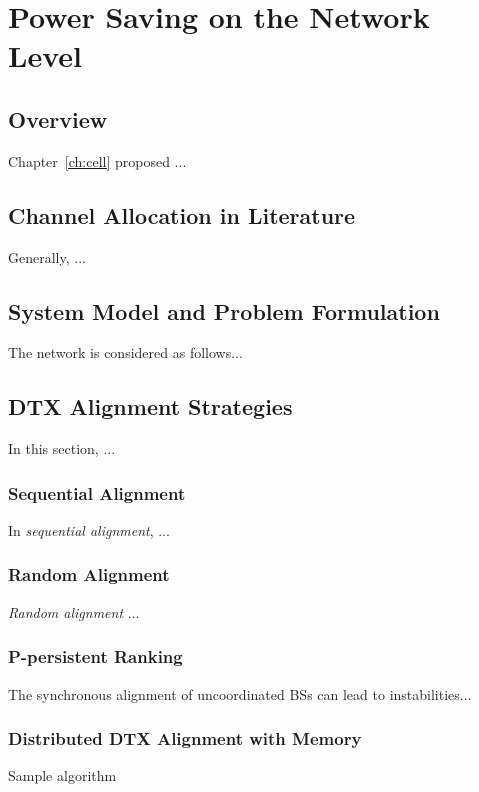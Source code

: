 \chapter{Power Saving on the Network Level}
\label{ch:network}

\section{Overview}
Chapter~\ref{ch:cell} proposed ...

\section{Channel Allocation in Literature}
\label{ch5:literature}
Generally, ...

\section{System Model and Problem Formulation}
\label{ch5:problem}
The network is considered as follows...

\section{\ac{DTX} Alignment Strategies}
\label{ch5:solutions}
In this section, ...
\subsection{Sequential Alignment}
In \emph{sequential alignment}, ...


\subsection{Random Alignment}
\emph{Random alignment} ...
\subsection{P-persistent Ranking}
The synchronous alignment of uncoordinated \acp{BS} can lead to instabilities...

\subsection{Distributed \ac{DTX} Alignment with Memory}
Sample algorithm 

